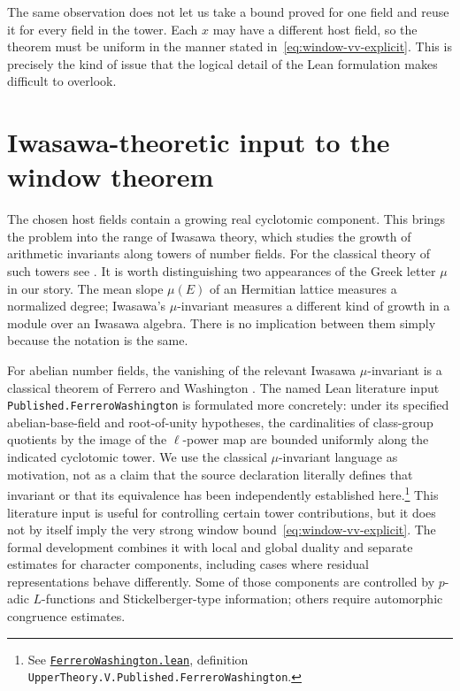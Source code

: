 \documentclass[11pt,openany,oneside]{scrbook}
\theoremstyle{definition}
\theoremstyle{remark}
\newcommand{\baseurl}{https://github.com/CocoSgt/riemann-hypothesis-lean/blob/7cbf7a0c32fca1badf05931879a37c3f8a2b03b4/}
\newcommand{\sourcefile}[2]{\href{\baseurl#1}{\texttt{#2}}}
\begin{document}
The same observation does not let us take a bound proved for one field and reuse it for every field in the tower.  Each $x$ may have a different host field, so the theorem must be uniform in the manner stated in~\eqref{eq:window-vv-explicit}.  This is precisely the kind of issue that the logical detail of the Lean formulation makes difficult to overlook.

\section{Iwasawa-theoretic input to the window theorem}\label{sec:iwasawa-role}

The chosen host fields contain a growing real cyclotomic component.  This brings the problem into the range of Iwasawa theory, which studies the growth of arithmetic invariants along towers of number fields. For the classical theory of such towers see \textcite{Iwasawa1973}.  It is worth distinguishing two appearances of the Greek letter $\mu$ in our story.  The mean slope $\mu(E)$ of an Hermitian lattice measures a normalized degree; Iwasawa's $\mu$-invariant measures a different kind of growth in a module over an Iwasawa algebra.  There is no implication between them simply because the notation is the same.

For abelian number fields, the vanishing of the relevant Iwasawa $\mu$-invariant is a classical theorem of Ferrero and Washington \parencite{FerreroWashington1979}. The named Lean literature input \texttt{Published.FerreroWashington} is formulated more concretely: under its specified abelian-base-field and root-of-unity hypotheses, the cardinalities of class-group quotients by the image of the $\ell$-power map are bounded uniformly along the indicated cyclotomic tower. We use the classical $\mu$-invariant language as motivation, not as a claim that the source declaration literally defines that invariant or that its equivalence has been independently established here.\footnote{See \sourcefile{src/Development/AutomorphicArithmetic/AutomorphicVarieties/PublishedTheorems/FerreroWashington.lean}{FerreroWashington.lean}, definition \texttt{UpperTheory.V.Published.FerreroWashington}.} This literature input is useful for controlling certain tower contributions, but it does not by itself imply the very strong window bound~\eqref{eq:window-vv-explicit}. The formal development combines it with local and global duality and separate estimates for character components, including cases where residual representations behave differently.  Some of those components are controlled by $p$-adic $L$-functions and Stickelberger-type information; others require automorphic congruence estimates.
\end{document}
